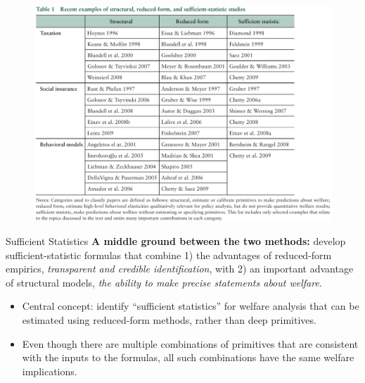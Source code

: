 \documentclass{beamer}
\begin{document}
\begin{frame}
	\begin{figure}[h]
		\centering
		\includegraphics[scale=0.65]{table1.png}
	\end{figure}
\end{frame}
\begin{frame}{Sufficient Statistics}
	\textbf{A middle ground between the two methods:} develop sufficient-statistic formulas that combine 1) the advantages of reduced-form empirics, \textit{transparent and credible identification}, with 2) an important advantage of structural models, \textit{the ability to make precise statements about welfare}.
	\medskip
	\begin{itemize}
		\item Central concept: identify “sufficient statistics” for welfare analysis that can be estimated using reduced-form methods, rather than deep primitives.
		\item Even though there are multiple combinations of primitives that are consistent with the inputs to the formulas, all such combinations have the same welfare implications.
	\end{itemize}
\end{frame}
\end{document}
